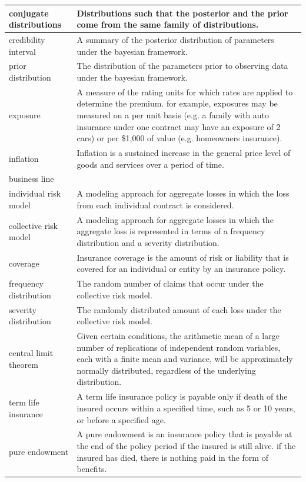 \documentclass[
]{book}
\begin{document}
\begin{longtable}{>{\raggedright\arraybackslash}p{10em}|>{\raggedright\arraybackslash}p{30em}}
\hline
conjugate distributions & Distributions such that the posterior and the prior come from the same family of distributions.\\
\hline
credibility interval & A summary of the posterior distribution of parameters under the bayesian framework.\\
\hline
prior distribution & The distribution of the parameters prior to observing data under the bayesian framework.\\
\hline
exposure & A measure of the rating units for which rates are applied to determine the premium. for example, exposures may be measured on a per unit basis (e.g. a family with auto insurance under one contract may have an exposure of 2 cars) or per \$1,000 of value (e.g. homeowners insurance).\\
\hline
inflation & Inflation is a sustained increase in the general price level of goods and services over a period of time.\\
\hline
business line & \\
\hline
individual risk model & A modeling approach for aggregate losses in which the loss from each individual contract is considered.\\
\hline
collective risk model & A modeling approach for aggregate losses in which the aggregate loss is represented in terms of a frequency distribution and a severity distribution.\\
\hline
coverage & Insurance coverage is the amount of risk or liability that is covered for an individual or entity by an insurance policy.\\
\hline
frequency distribution & The random number of claims that occur under the collective risk model.\\
\hline
severity distribution & The randomly distributed amount of each loss under the collective risk model.\\
\hline
central limit theorem & Given certain conditions, the arithmetic mean of a large number of replications of independent random variables, each with a finite mean and variance, will be approximately normally distributed, regardless of the underlying distribution.\\
\hline
term life insurance & A term life insurance policy is payable only if death of the insured occurs within a specified time, such as 5 or 10 years, or before a specified age.\\
\hline
pure endowment & A pure endowment is an insurance policy that is payable at the end of the policy period if the insured is still alive. if the insured has died, there is nothing paid in the form of benefits.\\

\end{longtable}
\end{document}
